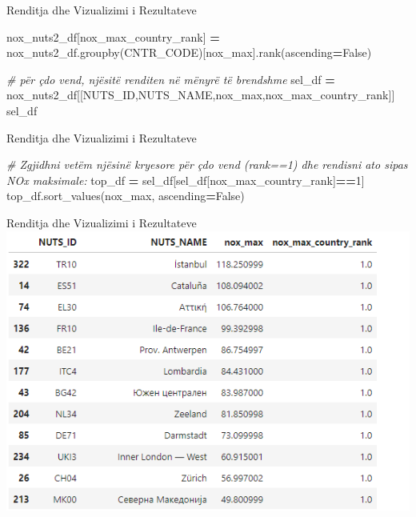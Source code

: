 \documentclass[
  ignorenonframetext,
]{beamer}
\newenvironment{Shaded}{\begin{snugshade}}{\end{snugshade}}
\newcommand{\CommentTok}[1]{\textcolor[rgb]{0.56,0.35,0.01}{\textit{#1}}}
\newcommand{\DecValTok}[1]{\textcolor[rgb]{0.00,0.00,0.81}{#1}}
\newcommand{\NormalTok}[1]{#1}
\newcommand{\OperatorTok}[1]{\textcolor[rgb]{0.81,0.36,0.00}{\textbf{#1}}}
\newcommand{\StringTok}[1]{\textcolor[rgb]{0.31,0.60,0.02}{#1}}
\newcommand{\VariableTok}[1]{\textcolor[rgb]{0.00,0.00,0.00}{#1}}
\begin{document}
\begin{frame}[fragile]{Renditja dhe Vizualizimi i Rezultateve}
\protect\hypertarget{renditja-dhe-vizualizimi-i-rezultateve-12}{}

\begin{Shaded}
\begin{Highlighting}[]
\NormalTok{nox\_nuts2\_df[}\StringTok{\textquotesingle{}nox\_max\_country\_rank\textquotesingle{}}\NormalTok{] }\OperatorTok{=}\NormalTok{ nox\_nuts2\_df.groupby(}\StringTok{\textquotesingle{}CNTR\_CODE\textquotesingle{}}\NormalTok{)[}\StringTok{\textquotesingle{}nox\_max\textquotesingle{}}\NormalTok{].rank(ascending}\OperatorTok{=}\VariableTok{False}\NormalTok{)}

\CommentTok{\# për çdo vend, njësitë renditen në mënyrë të brendshme}
\NormalTok{sel\_df }\OperatorTok{=}\NormalTok{ nox\_nuts2\_df[[}\StringTok{\textquotesingle{}NUTS\_ID\textquotesingle{}}\NormalTok{,}\StringTok{\textquotesingle{}NUTS\_NAME\textquotesingle{}}\NormalTok{,}\StringTok{\textquotesingle{}nox\_max\textquotesingle{}}\NormalTok{,}\StringTok{\textquotesingle{}nox\_max\_country\_rank\textquotesingle{}}\NormalTok{]]}
\NormalTok{sel\_df}
\end{Highlighting}
\end{Shaded}
\end{frame}

\begin{frame}[fragile]{Renditja dhe Vizualizimi i Rezultateve}
\protect\hypertarget{renditja-dhe-vizualizimi-i-rezultateve-13}{}

\begin{Shaded}
\begin{Highlighting}[]
\CommentTok{\# Zgjidhni vetëm njësinë kryesore për çdo vend (rank==1) dhe rendisni ato sipas NOx maksimale:}
\NormalTok{top\_df }\OperatorTok{=}\NormalTok{ sel\_df[sel\_df[}\StringTok{\textquotesingle{}nox\_max\_country\_rank\textquotesingle{}}\NormalTok{]}\OperatorTok{==}\DecValTok{1}\NormalTok{]}
\NormalTok{top\_df.sort\_values(}\StringTok{\textquotesingle{}nox\_max\textquotesingle{}}\NormalTok{, ascending}\OperatorTok{=}\VariableTok{False}\NormalTok{)}
\end{Highlighting}
\end{Shaded}
\end{frame}

\begin{frame}{Renditja dhe Vizualizimi i Rezultateve}
\protect\hypertarget{renditja-dhe-vizualizimi-i-rezultateve-14}{}
\includegraphics{./Figs/eunox4.png}
\end{frame}
\end{document}
